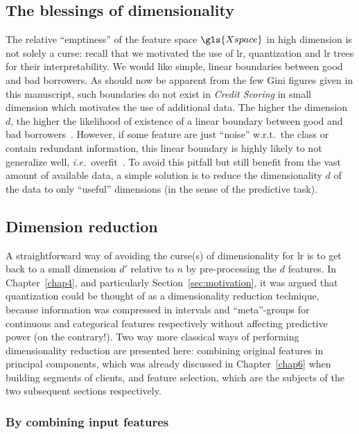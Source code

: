 \subsection{The blessings of dimensionality}

The relative ``emptiness'' of the feature space $\gls{Xspace}$ in high dimension is not solely a curse: recall that we motivated the use of \gls{lr}, quantization and \gls{lr} trees for their interpretability. We would like simple, linear boundaries between good and bad borrowers. As should now be apparent from the few Gini figures given in this manuscript, such boundaries do not exist in \textit{Credit Scoring} in small dimension which motivates the use of additional data. The higher the dimension $d$, the higher the likelihood of existence of a linear boundary between good and bad borrowers~\cite{gorban2018blessing}. However, if some feature are just ``noise'' w.r.t.\ the class or contain redundant information, this linear boundary is highly likely to not generalize well, \textit{i.e.}\ overfit~\cite{bertrandagnan_2017}. To avoid this pitfall but still benefit from the vast amount of available data, a simple solution is to reduce the dimensionality $d$ of the data to only ``useful'' dimensions (in the sense of the predictive task).

\subsection{Dimension reduction}

A straightforward way of avoiding the curse(s) of dimensionality for \gls{lr} is to get back to a small dimension $d'$ relative to $n$ by pre-processing the $d$ features. In Chapter~\ref{chap4}, and particularly Section~\ref{sec:motivation}, it was argued that quantization could be thought of as a dimensionality reduction technique, because information was compressed in intervals and ``meta''-groups for continuous and categorical features respectively without affecting predictive power (on the contrary!). Two way more classical ways of performing dimensionality reduction are presented here: combining original features in principal components, which was already discussed in Chapter~\ref{chap6} when building segments of clients, and feature selection, which are the subjects of the two subsequent sections respectively.

\subsubsection{By combining input features}

